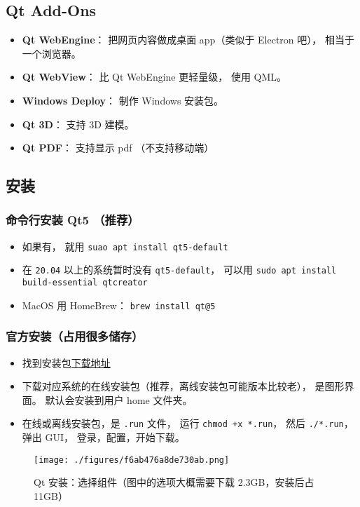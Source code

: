 \subsection{Qt Add-Ons}
\begin{itemize}
\item \textbf{Qt WebEngine}： 把网页内容做成桌面 app（类似于 Electron 吧）， 相当于一个浏览器。
\item \textbf{Qt WebView}： 比 Qt WebEngine 更轻量级， 使用 QML。
\item \textbf{Windows Deploy}： 制作 Windows 安装包。
\item \textbf{Qt 3D}： 支持 3D 建模。
\item \textbf{Qt PDF}： 支持显示 pdf （不支持移动端）
\end{itemize}


\subsection{安装}
\subsubsection{命令行安装 Qt5 （推荐）}
\begin{itemize}
\item 如果有， 就用 \verb|suao apt install qt5-default|
\item 在 \verb|20.04| 以上的系统暂时没有 \verb|qt5-default|， 可以用 \verb|sudo apt install build-essential qtcreator|
\item MacOS 用 HomeBrew： \verb`brew install qt@5`
\end{itemize}

\subsubsection{官方安装（占用很多储存）}
\begin{itemize}
\item 找到安装包\href{https://www.qt.io/download-qt-installer}{下载地址}
\item 下载对应系统的在线安装包（推荐，离线安装包可能版本比较老）， 是图形界面。 默认会安装到用户 home 文件夹。
\item 在线或离线安装包，是 \verb|.run| 文件， 运行 \verb|chmod +x *.run|， 然后 \verb|./*.run|， 弹出 GUI， 登录，配置，开始下载。
\end{itemize}

\begin{figure}[ht]
\centering
\texttt{[image: ./figures/f6ab476a8de730ab.png]}
\caption{Qt 安装：选择组件（图中的选项大概需要下载 2.3GB，安装后占 11GB）} \label{fig_QtInt_3}
\end{figure}


